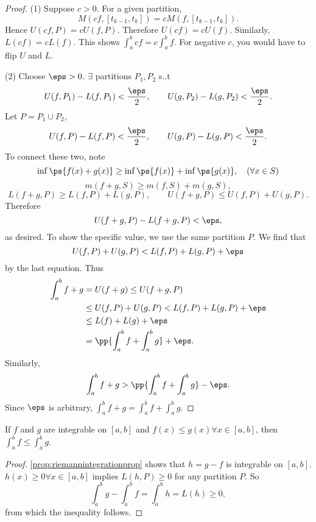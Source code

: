 \documentclass[11pt]{scrartcl}
\numberwithin{equation}{section}
\begin{document}
\begin{proof}
    (1) Suppose $c>0$. For a given partition, 
    \[
        M(cf, [t_{k-1},t_k]) = cM(f,[t_{k-1},t_k]).
    \] 
    Hence $U(cf,P) = cU(f,P)$. Therefore $U(cf) = cU(f)$.
    Similarly, $L(cf)=cL(f)$. This shows $\int_a^b cf = c\int_a^b f$.
    For negative $c$, you would have to flip $U$ and $L$.

    (2) Choose $\eps>0$. $\exists$ partitions $P_1,P_2$ s..t 
    \[
        U(f,P_1) - L(f,P_1) < \frac{\eps}{2}, \qquad U(g,P_2) - L(g,P_2) < \frac{\eps}{2}.
    \]
    Let $P = P_1\cup P_2$,
    \[
        U(f,P)-L(f,P) < \frac{\eps}{2}, \qquad U(g,P)-L(g,P) < \frac{\eps}{2}.
    \]
    To connect these two, note 
    \[
        \inf\ps{f(x)+g(x)} \geq \inf\ps{f(x)} + \inf\ps{g(x)},\quad (\forall x\in S)
    \]
    \[
        m(f+g,S) \geq m(f,S) + m(g,S),
    \]
    \[
        L(f+g,P) \geq L(f,P)+ L(g,P), \qquad U(f+g,P) \leq U(f,P)+U(g,P).
    \]
    Therefore 
    \[
        U(f+g,P) - L(f+g,P) < \eps,
    \]
    as desired.
    To show the specific value, we use the same partition $P$.
    We find that 
    \[
        U(f,P) + U(g,P) < L(f,P) + L(g,P) + \eps
    \]
    by the last equation. Thus
    \begin{align*}
        \int_a^b f+g &= U(f+g) \leq U(f+g,P) \\
        &\leq U(f,P)+U(g,P) < L(f,P) + L(g,P) + \eps \\
        &\leq L(f) + L(g) + \eps \\
        &= \pp{\int_a^b f + \int_a^b g} +\eps.
    \end{align*}
    Similarly, 
    \[
        \int_a^b f+g > \pp{\int_a^b f + \int_a^b g} - \eps.
    \]
    Since $\eps$ is arbitrary, $\int_a^b f+g = \int_a^b f+\int_a^b g$.
\end{proof}

\begin{proposition}
    \label{prop:integralfunctioninequality}
    If $f$ and $g$ are integrable on $[a,b]$ and $f(x)\leq g(x) \forall x\in[a,b]$, then $\int_a^bf\leq\int_a^bg$.
\end{proposition}

\begin{proof}
    \cref{prop:riemannintegrationprop} shows that $h=g-f$ is integrable on 
    $[a,b]$. $h(x)\geq 0 \forall x\in[a,b]$ implies $L(h,P)\geq 0$ for any 
    partition $P$. So
    \[
        \int_a^bg - \int_a^b f = \int_a^b h = L(h) \geq 0,
    \]
    from which the inequality follows.
\end{proof}
\end{document}
